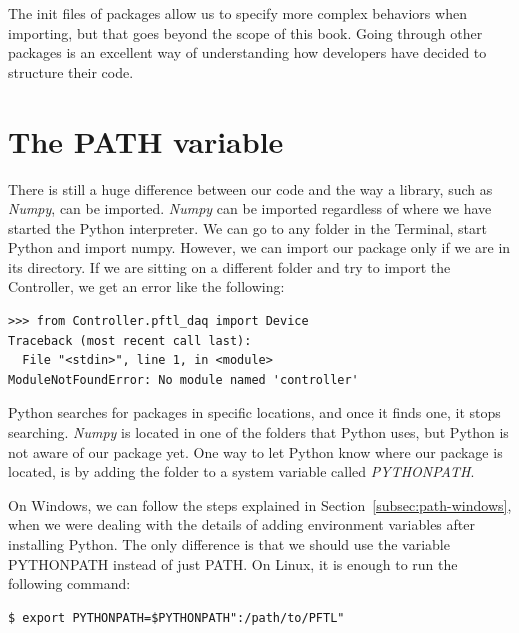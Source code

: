 
The init files of packages allow us to specify more complex behaviors when importing, but that goes beyond the scope of this book. Going through other packages is an excellent way of understanding how developers have decided to structure their code.

\section{The PATH variable}\label{sec:path}
There is still a huge difference between our code and the way a library, such as \emph{Numpy}, can be imported. \emph{Numpy} can be imported regardless of where we have started the Python interpreter. We can go to any folder in the Terminal, start Python and import numpy. However, we can import our package only if we are in its directory. If we are sitting on a different folder and try to import the Controller, we get an error like the following:

\begin{verbatim}
>>> from Controller.pftl_daq import Device
Traceback (most recent call last):
  File "<stdin>", line 1, in <module>
ModuleNotFoundError: No module named 'controller'
\end{verbatim}

Python searches for packages in specific locations, and once it finds one, it stops searching. \emph{Numpy} is located in one of the folders that Python uses, but Python is not aware of our package yet. One way to let Python know where our package is located, is by adding the folder to a system variable called \emph{PYTHONPATH}.

On Windows, we can follow the steps explained in Section~\ref{subsec:path-windows}, when we were dealing with the details of adding environment variables after installing Python. The only difference is that we should use the variable PYTHONPATH instead of just PATH. On Linux, it is enough to run the following command:

\begin{verbatim}
$ export PYTHONPATH=$PYTHONPATH":/path/to/PFTL"
\end{verbatim}

